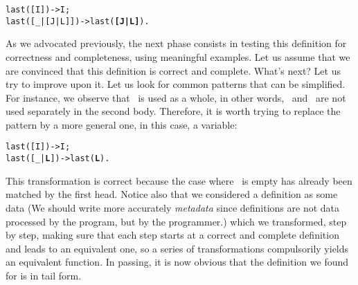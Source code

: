 \begin{alltt}
last(      [I]) -> I;
last([_|[J|L]]) -> last(\textbf{[J|L]}).
\end{alltt}
As we advocated previously, the next phase consists in testing this
definition for correctness and completeness, using meaningful
examples. Let us assume that we are convinced that this definition is
correct and complete. What's next? Let us try to improve upon it. Let
us look for common patterns that can be simplified. For instance, we
observe that \erlcode{[J|L]}~is used as a whole, in other words,
~and~ are not used separately in the second
body. Therefore, it is worth trying to replace the pattern by a more
general one, in this case, a variable:
\begin{alltt}
last(  [I]) -> I;
last([_|\textbf{L}]) -> last(\textbf{L}).\hfill% L \emph{is non-empty}
\end{alltt}
This transformation is correct because the case where ~is
empty has already been matched by the first head. Notice also that we
considered a definition as some data (We should write more accurately
\emph{metadata} since definitions are not data processed by the
program, but by the programmer.) which we transformed, step by step,
making sure that each step starts at a correct and complete definition
and leads to an equivalent one, so a series of transformations
compulsorily yields an equivalent function. In passing, it is now
obvious that the definition we found for  is in tail
form.

